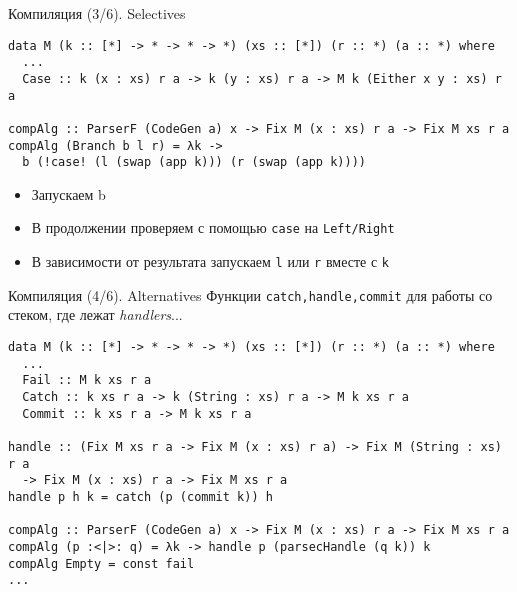 \begin{frame}[fragile]{Компиляция (3/6). Selectives }
\begin{verbatim}
data M (k :: [*] -> * -> * -> *) (xs :: [*]) (r :: *) (a :: *) where
  ...
  Case :: k (x : xs) r a -> k (y : xs) r a -> M k (Either x y : xs) r a
  
compAlg :: ParserF (CodeGen a) x -> Fix M (x : xs) r a -> Fix M xs r a  
compAlg (Branch b l r) = λk -> 
  b (!case! (l (swap (app k))) (r (swap (app k))))
\end{verbatim}
\newln 

\begin{itemize}
\item Запускаем b
\item В продолжении проверяем с помощью \verb=case= на \texttt{Left/Right}
\item В зависимости от результата запускаем \texttt{l}
или \texttt{r} вместе с \texttt{k}
\end{itemize}
\end{frame}

\begin{frame}[fragile]{Компиляция (4/6). Alternatives}
Функции \texttt{catch,handle,commit} для работы со стеком, где лежат \emph{handlers}...

\begin{verbatim}
data M (k :: [*] -> * -> * -> *) (xs :: [*]) (r :: *) (a :: *) where
  ...
  Fail :: M k xs r a
  Catch :: k xs r a -> k (String : xs) r a -> M k xs r a
  Commit :: k xs r a -> M k xs r a
  
handle :: (Fix M xs r a -> Fix M (x : xs) r a) -> Fix M (String : xs) r a
  -> Fix M (x : xs) r a -> Fix M xs r a
handle p h k = catch (p (commit k)) h

compAlg :: ParserF (CodeGen a) x -> Fix M (x : xs) r a -> Fix M xs r a
compAlg (p :<|>: q) = λk -> handle p (parsecHandle (q k)) k
compAlg Empty = const fail
...
\end{verbatim}
\end{frame}



